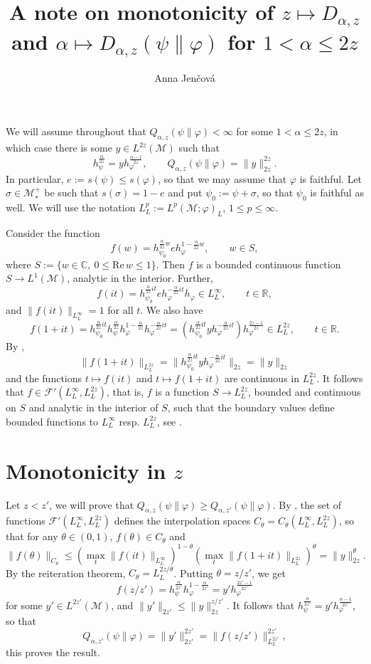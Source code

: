 \documentclass[12pt]{article}
\title{A note on monotonicity of  $z\mapsto D_{\alpha,z}$ and $\alpha\mapsto
D_{\alpha,z}(\psi\|\varphi)$ for $1<\alpha\le 2z$}
\author{Anna Jen\v cov\'a}
\theoremstyle{definition}
\theoremstyle{remark}
\def\Me{\mathcal M}
\def\Fe{\mathcal F}
\begin{document}
\maketitle

We will assume throughout that $Q_{\alpha,z}(\psi\|\varphi)<\infty$ for some $1<\alpha\le
2z$, in which case there is some $y\in L^{2z}(\Me)$ such that
\[
h_\psi^{\frac{\alpha}{2z}}=yh_\varphi^{\frac{\alpha-1}{2z}},\qquad
Q_{\alpha,z}(\psi\|\varphi)=\|y\|_{2z}^{2z}.
\]
In particular, $e:=s(\psi)\le s(\varphi)$, so that we may assume that $\varphi$ is
faithful. Let $\sigma\in \Me_*^+$ be such that
$s(\sigma)=1-e$ and put $\psi_0:=\psi+\sigma$, so that $\psi_0$ is faithful as well. We will use the notation
$L^p_L:=L^p(\Me;\varphi)_L$, $1\le p\le \infty$.

Consider the function 
\[
f(w)=h_{\psi_0}^{\frac{\alpha}{2z}w}eh_\varphi^{1-\frac{\alpha}{2z}w},\qquad w\in S,
\]
where $S:=\{w\in \mathbb C,\ 0\le \mathrm{Re}\,w\le 1\}$. Then $f$ is a bounded continuous
function $S\to L^1(\Me)$, analytic in the interior. Further, 
\[
f(it)=h_{\psi_0}^{\frac{\alpha}{2z}it}eh_\varphi^{-\frac{\alpha}{2z}it}h_\varphi\in
L^\infty_L,\qquad t\in \mathbb R,
\]
and $\|f(it)\|_{L^\infty_L}=1$ for all $t$.
We also have 
\[
f(1+it)=h_{\psi_0}^{\frac{\alpha}{2z}it}h_\psi^{\frac{\alpha}{2z}}h_\varphi^{1-\frac{\alpha}{2z}}h_\varphi^{-\frac{\alpha}{2z}it}=
(h_{\psi_0}^{\frac{\alpha}{2z}it}yh_\varphi^{-\frac{\alpha}{2z}it})h_\varphi^{\frac{2z-1}{2z}}\in
L^{2z}_L,\qquad t\in \mathbb R.
\]
By \cite[Lemmas 10.1 and 10.2]{kosaki1984applications}, 
\[
 \|f(1+it)\|_{L^{2z}_L}=\|h_{\psi_0}^{\frac{\alpha}{2z}it}yh_\varphi^{-\frac{\alpha}{2z}it}\|_{2z}=\|y\|_{2z}
\]
and the functions $t\mapsto f(it)$ and $t\mapsto f(1+it)$ are continuous in $L^{2z}_L$. It
follows that $f\in \Fe'(L^\infty_L, L^{2z}_L)$, that is, $f$ is a function $S\to L^{2z}_L$,
bounded and  continuous on $S$ and analytic in the interior of $S$, such that the boundary
values define  bounded functions to $L^\infty_L$ resp. $L^{2z}_L$, see \cite[Definition
1.4]{kosaki1984applications}. 



\section{Monotonicity in $z$}

Let $z<z'$,  we will prove that $Q_{\alpha,z}(\psi\|\varphi)\ge Q_{\alpha,z'}(\psi\|\varphi)$.
By \cite[Remark 3.4]{kosaki1984applications}, the set of functions
$\Fe'(L^\infty_L,L^{2z}_L)$ defines the interpolation spaces
$C_\theta=C_\theta(L^\infty_L,L^{2z}_L)$, so that for any $\theta\in (0,1)$, $f(\theta)\in
C_\theta$ and 
\[
\|f(\theta)\|_{C_\theta}\le (\max_t \|f(it)\|_{L^\infty_L})^{1-\theta}(\max_t
\|f(1+it)\|_{L^{2z}_L})^\theta=\|y\|_{2z}^\theta.
\]
By the reiteration theorem, $C_\theta=L^{2z/\theta}_L$. Putting $\theta=z/z'$, we get
\[
f(z/z')=h_{\psi}^{\frac{\alpha}{2z'}}h_\varphi^{1-\frac{\alpha}{2z'}}=y'h_\varphi^{\frac{2z'-1}{2z'}}
\]
for some $y'\in L^{2z'}(\Me)$, and  $\|y'\|_{2z'}\le \|y\|_{2z}^{z/z'}$. It follows that
$h_\psi^{\frac{\alpha}{2z'}}=y'h_\varphi^{\frac{\alpha-1}{2z'}}$, so that 
\[
Q_{\alpha,z'}(\psi\|\varphi)=\|y'\|_{2z'}^{2z'}=\|f(z/z')\|_{L^{2z'}_L}^{2z'},
\]
this proves the result.
\end{document}
